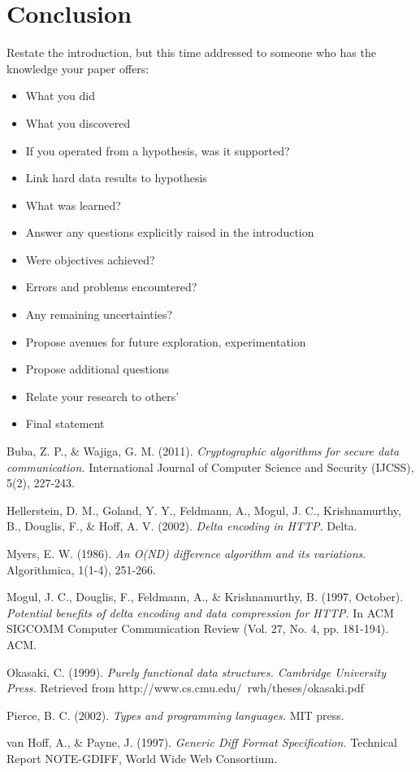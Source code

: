 \documentclass[12pt,a4paper]{article}
\begin{document}
	\section{Conclusion}
	Restate the introduction, but this time addressed to someone who has the knowledge your paper offers:
	\begin{itemize}
		\item What you did
		\item What you discovered
		\item If you operated from a hypothesis, was it supported?
		\item Link hard data results to hypothesis
		\item What was learned?
		\item Answer any questions explicitly raised in the introduction
		\item Were objectives achieved?
		\item Errors and problems encountered?
		\item Any remaining uncertainties?
		\item Propose avenues for future exploration, experimentation
		\item Propose additional questions
		\item Relate your research to others'
		\item Final statement
	\end{itemize}
	
	\begin{thebibliography}{9}
		
		Buba, Z. P., \& Wajiga, G. M. (2011). 
		\textit{Cryptographic algorithms for secure data communication.} 
		International Journal of Computer Science and Security (IJCSS), 5(2), 227-243.
		
		Hellerstein, D. M., Goland, Y. Y., Feldmann, A., Mogul, J. C., Krishnamurthy, B., Douglis, F., \& Hoff, A. V. (2002). 
		\textit{Delta encoding in HTTP.} 
		Delta.
		
		Myers, E. W. (1986). 
		\textit{An O(ND) difference algorithm and its variations. }
		Algorithmica, 1(1-4), 251-266.
		
		Mogul, J. C., Douglis, F., Feldmann, A., \& Krishnamurthy, B. (1997, October). 
		\textit{Potential benefits of delta encoding and data compression for HTTP.}
		In ACM SIGCOMM Computer Communication Review (Vol. 27, No. 4, pp. 181-194). ACM.
				
		Okasaki, C. (1999). 
		\textit{Purely functional data structures. Cambridge University Press.}
		Retrieved from http://www.cs.cmu.edu/~rwh/theses/okasaki.pdf
		
		Pierce, B. C. (2002). 
		\textit{Types and programming languages.} 
		MIT press.
		
		van Hoff, A., \& Payne, J. (1997). 
		\textit{Generic Diff Format Specification.}
		Technical Report NOTE-GDIFF, World Wide Web Consortium.
		
	\end{thebibliography}
	
\end{document}
